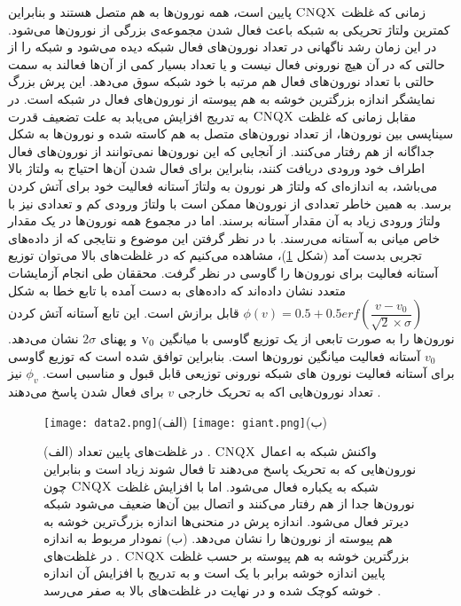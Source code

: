  زمانی که غلظت   $\textsc{CNQX}$  پایین است، همه نورون‌ها به هم متصل هستند و بنابراین کمترین ولتاژ تحریکی به شبکه باعث فعال شدن مجموعه‌ی بزرگی از نورون‌ها می‌شود. در این زمان رشد ناگهانی‌ در  تعداد نورون‌های فعال شبکه دیده می‌شود و شبکه را از حالتی که در آن هیچ نورونی فعال نیست و یا تعداد بسیار کمی از آن‌ها فعالند به سمت حالتی با تعداد نورون‌های فعال هم مرتبه با خود شبکه سوق می‌دهد. این پرش بزرگ نمایشگر اندازه بزرگترین خوشه به هم پیوسته از نورون‌های فعال در شبکه است. در مقابل زمانی‌ که غلظت   $\textsc{CNQX}$  به تدریج افزایش می‌یابد به علت تضعیف قدرت سیناپسی بین نورون‌ها، از تعداد نورون‌های متصل به هم کاسته شده و نورون‌ها به شکل جداگانه از هم رفتار می‌کنند. از آنجایی که این نورون‌ها نمی‌توانند از نورون‌های فعال اطراف خود ورودی دریافت کنند، بنابراین برای فعال شدن آن‌ها احتیاج به ولتاژ بالا می‌باشد، به اندازه‌ای که ولتاژ هر نورون به ولتاژ آستانه فعالیت خود برای آتش کردن برسد. به همین خاطر تعدادی از نورون‌ها ممکن است با ولتاژ ورودی کم و تعدادی نیز با ولتاژ ورودی زیاد به آن مقدار آستانه برسند. اما در مجموع همه نورون‌ها در یک مقدار خاص میانی به آستانه می‌رسند. با در نظر گرفتن این موضوع و نتایجی که از داده‌های تجربی بدست آمد (شکل \ref{fig:s(a)})، مشاهده می‌کنیم که در غلظت‌های بالا می‌توان توزیع آستانه فعالیت برای نورون‌ها را گاوسی در نظر گرفت. محققان طی انجام آزمایشات متعدد نشان داده‌اند که داده‌های به دست آمده با تابع خطا به شکل
  $\phi(v) = 0.5 + 0.5erf(\dfrac{v-v_{0}}{\surd2\times\sigma})$ 
  قابل برازش است. این تابع آستانه آتش کردن نورون‌ها را به صورت تابعی از یک توزیع گاوسی با میانگین
   $\textsc{v}_{0}$
    و پهنای
     $2\sigma$ 
     نشان می‌دهد.
      $v_{0}$ 
       آستانه فعالیت میانگین نورون‌ها است. بنابراین توافق شده است که توزیع گاوسی برای آستانه فعالیت نورون های شبکه نورونی توزیعی قابل قبول و مناسبی است.  
       $\phi_{v}$ 
       نیز تعداد نورون‌هایی ا که به تحریک خارجی 
       $v$ 
       برای فعال شدن پاسخ می‌دهند \cite{sorian}.

\begin{figure}[htbp]
\hspace*{0cm}
\centering
\texttt{[image: data2.png]}\centering(الف)   
\texttt{[image: giant.png]}\centering(ب)
\caption[واکنش شبکه به اعمال   $\textsc{CNQX}$ ] {\footnotesize
 (الف) واکنش شبکه به اعمال   $\textsc{CNQX}$ . در غلظت‌های پایین تعداد نورون‌هایی که به تحریک پاسخ می‌دهند تا فعال شوند زیاد است و بنابراین شبکه به یکباره فعال می‌شود. اما با افزایش غلظت   $\textsc{CNQX}$  چون نورون‌ها جدا از هم رفتار می‌کنند و اتصال بین آن‌ها ضعیف می‌شود شبکه دیرتر فعال می‌شود. اندازه پرش در  منحنی‌ها اندازه بزرگ‌ترین خوشه به هم پیوسته از نورون‌ها را نشان می‌دهد. (ب) نمودار مربوط به اندازه بزرگترین خوشه به هم پیوسته بر حسب غلظت   $\textsc{CNQX}$ . در غلظت‌های پایین اندازه خوشه برابر با یک است و به تدریج با افزایش آن اندازه خوشه کوچک شده و در نهایت در غلظت‌های بالا به صفر می‌رسد \cite{sori}.}
\label{fig:s(a)}
\end{figure}

